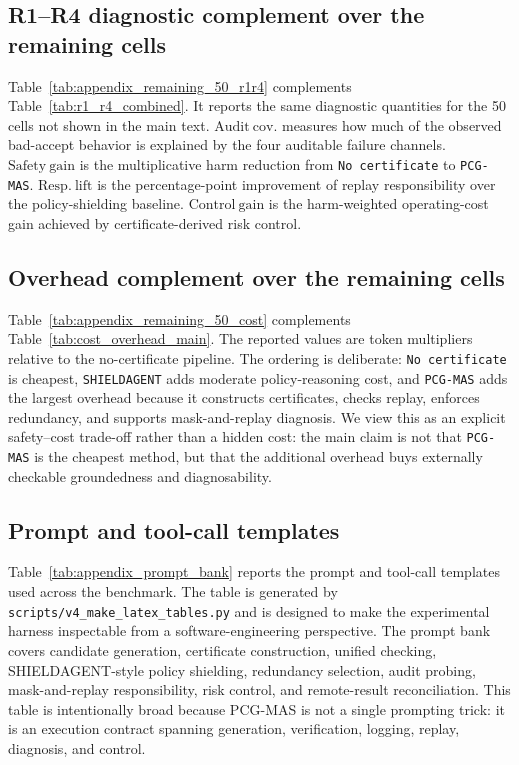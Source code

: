 \subsection{R1--R4 diagnostic complement over the remaining cells}
\label{appendix:exp_details:r1r4}

Table~\ref{tab:appendix_remaining_50_r1r4} complements
Table~\ref{tab:r1_r4_combined}. It reports the same diagnostic quantities for the 50 cells not shown
in the main text. \(\mathrm{Audit\ cov.}\) measures how much of the observed bad-accept behavior is
explained by the four auditable failure channels. \(\mathrm{Safety\ gain}\) is the multiplicative
harm reduction from \texttt{No certificate} to \texttt{PCG-MAS}. \(\mathrm{Resp.\ lift}\) is the
percentage-point improvement of replay responsibility over the policy-shielding baseline.
\(\mathrm{Control\ gain}\) is the harm-weighted operating-cost gain achieved by certificate-derived
risk control.



\subsection{Overhead complement over the remaining cells}
\label{appendix:exp_details:overhead}

Table~\ref{tab:appendix_remaining_50_cost} complements Table~\ref{tab:cost_overhead_main}. The
reported values are token multipliers relative to the no-certificate pipeline. The ordering is
deliberate: \texttt{No certificate} is cheapest, \texttt{SHIELDAGENT} adds moderate policy-reasoning
cost, and \texttt{PCG-MAS} adds the largest overhead because it constructs certificates, checks
replay, enforces redundancy, and supports mask-and-replay diagnosis. We view this as an explicit
safety--cost trade-off rather than a hidden cost: the main claim is not that \texttt{PCG-MAS} is the
cheapest method, but that the additional overhead buys externally checkable groundedness and
diagnosability.



\subsection{Prompt and tool-call templates}
\label{appendix:exp_details:prompts}

Table~\ref{tab:appendix_prompt_bank} reports the prompt and tool-call templates used across the
benchmark. The table is generated by \texttt{scripts/v4\_make\_latex\_tables.py} and is designed to
make the experimental harness inspectable from a software-engineering perspective. The prompt bank
covers candidate generation, certificate construction, unified checking, SHIELDAGENT-style policy
shielding, redundancy selection, audit probing, mask-and-replay responsibility, risk control, and
remote-result reconciliation. This table is intentionally broad because PCG-MAS is not a single
prompting trick: it is an execution contract spanning generation, verification, logging, replay,
diagnosis, and control.

